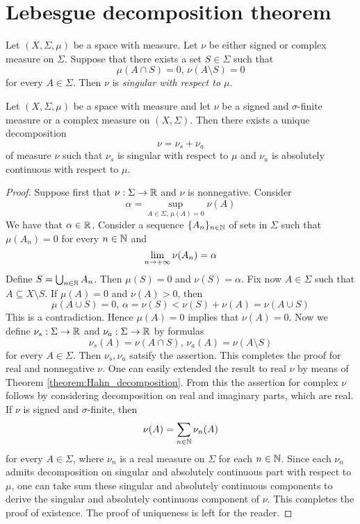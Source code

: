 \section{Lebesgue decomposition theorem}

\begin{definition}
    Let $(X,\Sigma,\mu)$ be a space with measure. Let $\nu$ be either signed or complex measure on $\Sigma$. Suppose that there exists a set $S\in \Sigma$ such that
    $$\mu(A\cap S) = 0,\,\nu(A\setminus S) = 0$$
    for every $A \in \Sigma$. Then $\nu$ is \textit{singular with respect to $\mu$}.
\end{definition}

\begin{theorem}\label{theorem:lebesguede_composition}
    Let $(X,\Sigma,\mu)$ be a space with measure and let $\nu$ be a signed and $\sigma$-finite measure or a complex measure on $(X,\Sigma)$. Then there exists a unique decomposition
    $$\nu = \nu_s + \nu_a$$
    of measure $\nu$ such that $\nu_s$ is singular with respect to $\mu$ and $\nu_a$ is absolutely continuous with respect to $\mu$.
\end{theorem}
\begin{proof}
    Suppose first that $\nu:\Sigma \rightarrow {\mathbb R}$ and $\nu$ is nonnegative. Consider
    $$\alpha = \sup_{A\in \Sigma,\,\mu(A)=0}\nu(A)$$
    We have that $\alpha \in {\mathbb R}$. Consider a sequence $\{A_n\}_{n\in {\mathbb N}}$ of sets in $\Sigma$ such that $\mu(A_n)=0$ for every $n\in {\mathbb N}$ and 
    $$\lim_{n\rightarrow +\infty}\nu(A_n)=\alpha$$
    Define $S = \bigcup_{n\in {\mathbb N}}A_n$. Then $\mu(S) = 0$ and $\nu(S) = \alpha$. Fix now $A\in \Sigma$ such that $A \subseteq X\setminus S$. If $\mu(A) = 0$ and $\nu(A) > 0$, then 
    $$\mu(A\cup S) = 0,\,\alpha = \nu(S) < \nu(S) + \nu(A) = \nu(A\cup S)$$
    This is a contradiction. Hence $\mu(A) = 0$ implies that $\nu(A) = 0$. Now we define $\nu_s:\Sigma \rightarrow {\mathbb R}$ and $\nu_a:\Sigma \rightarrow {\mathbb R}$ by formulas
    $$\nu_s(A) = \nu(A\cap S),\,\nu_a(A) = \nu(A\setminus S)$$
    for every $A\in \Sigma$. Then $\nu_s,\nu_a$ satsify the assertion. This completes the proof for real and nonnegative $\nu$. One can easily extended the result to real $\nu$ by means of Theorem \ref{theorem:Hahn_decomposition}. From this the assertion for complex $\nu$ follows by considering decomposition on real and imaginary parts, which are real. If $\nu$ is signed and $\sigma$-finite, then 
    $$\nu(A) = \sum_{n\in {\mathbb N}}\nu_n(A)$$
    for every $A \in \Sigma$, where $\nu_n$ is a real measure on $\Sigma$ for each $n\in {\mathbb N}$. Since each $\nu_n$ admits decomposition on singular and absolutely continuous part with respect to $\mu$, one can take sum these singular and absolutely continuous components to derive the singular and absolutely continuous component of $\nu$. This completes the proof of existence. The proof of uniqueness is left for the reader.
\end{proof}

